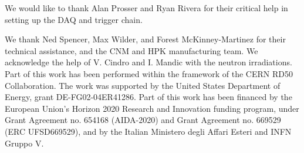 \documentclass[preprint,1p]{elsarticle}
\begin{document}
We would like to thank Alan Prosser and Ryan Rivera for their critical help in
setting up the DAQ and trigger chain. 

We thank Ned Spencer, Max Wilder, and Forest McKinney-Martinez for their
technical assistance, and the CNM and HPK manufacturing team. We acknowledge the
help of V. Cindro and I. Mandic with the neutron irradiations. Part of this work
has been performed within the framework of the CERN RD50 Collaboration. The work
was supported by the United States Department of Energy, grant
DE-FG02-04ER41286. Part of this work has been financed by the European Union’s
Horizon 2020 Research and Innovation funding program, under Grant Agreement no.
654168 (AIDA-2020) and Grant Agreement no. 669529 (ERC UFSD669529), and by the
Italian Ministero degli Affari Esteri and INFN Gruppo V.





{}
 




\end{document}
